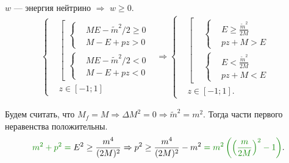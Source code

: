 \documentclass[a4paper,12pt,landscape]{article}
\begin{document}
$w$ --- энергия нейтрино $\Rightarrow$ $w\ge{}0$.
\begin{align}
\left\lbrace
\begin{aligned}
&\left[
\begin{aligned}
\left\lbrace
\begin{aligned}
&ME-\tilde{m}^{2}/2\ge{}0\\
&M-E+pz>0
\end{aligned}\right.\\
\left\lbrace
\begin{aligned}
&ME-\tilde{m}^{2}/2<0\\
&M-E+pz<0
\end{aligned}\right.
\end{aligned}\right.\\
&z\in[-1;1]
\end{aligned}\right.\Rightarrow
\left\lbrace
\begin{aligned}
&\left[
\begin{aligned}
&\left\lbrace
\begin{aligned}
&E\ge{}\frac{\tilde{m}^{2}}{2M}\\
&pz+M>E
\end{aligned}\right.\\
&\left\lbrace
\begin{aligned}
&E<\frac{\tilde{m}^{2}}{2M}\\
&pz+M<E
\end{aligned}\right.
\end{aligned}\right.\\
&z\in[-1;1].
\end{aligned}\right.
\label{all}
\end{align}

Будем считать, что $M_{f}=M\Rightarrow \Delta{M}^{2}=0\Rightarrow \tilde{m}^{2}=m^{2}$. Тогда части первого неравенства положительны.
\begin{align*}
{\color{MYgreen}m^{2}+p^{2}={}}E^{2}\ge{}\frac{m^{4}}{(2M)^{2}}\Rightarrow
p^{2}\ge{}\frac{m^{4}}{(2M)^{2}}-m^{2}{\color{MYgreen}{}=m^{2}\left(\left(\frac{m}{2M}\right)^{2}-1\right)}.
\end{align*}
\end{document}

